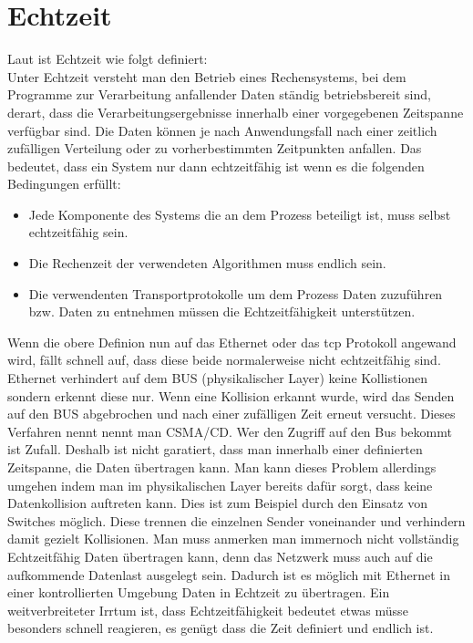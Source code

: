 \section{Echtzeit}
Laut \citet{Scholz:2005} ist Echtzeit wie folgt definiert:\\
\glqq Unter Echtzeit versteht man den Betrieb
eines Rechensystems, bei dem Programme zur Verarbeitung
anfallender Daten ständig betriebsbereit sind, derart, dass die
Verarbeitungsergebnisse innerhalb einer vorgegebenen Zeitspanne
verfügbar sind. Die Daten können je nach Anwendungsfall nach
einer zeitlich zufälligen Verteilung oder zu vorherbestimmten
Zeitpunkten anfallen.\grqq
Das bedeutet, dass ein System nur dann echtzeitfähig ist wenn es die folgenden Bedingungen erfüllt:
\begin{itemize}
  \item Jede Komponente des Systems die an dem Prozess beteiligt ist, muss selbst echtzeitfähig sein.
  \item Die Rechenzeit der verwendeten Algorithmen muss endlich sein.
  \item Die verwendenten Transportprotokolle um dem Prozess Daten zuzuführen bzw. Daten zu entnehmen müssen die Echtzeitfähigkeit unterstützen.
\end{itemize}
Wenn die obere Definion nun auf das Ethernet oder das \ac{tcp} Protokoll angewand wird, fällt schnell auf, 
dass diese beide normalerweise nicht echtzeitfähig sind.
Ethernet verhindert auf dem BUS (physikalischer Layer) keine Kollistionen sondern erkennt diese nur. 
Wenn eine Kollision erkannt wurde, 
wird das Senden auf den BUS abgebrochen und nach einer zufälligen Zeit erneut versucht.
Dieses Verfahren nennt nennt man \ac{CSMA/CD}. 
Wer den Zugriff auf den Bus bekommt ist Zufall.
Deshalb ist nicht garatiert, dass man innerhalb einer definierten Zeitspanne, die Daten übertragen kann.
Man kann dieses Problem allerdings umgehen indem man im physikalischen Layer bereits dafür sorgt, 
dass keine Datenkollision auftreten kann. Dies ist zum Beispiel durch den Einsatz von Switches möglich.
Diese trennen die einzelnen Sender voneinander und verhindern damit gezielt Kollisionen.
Man muss anmerken man immernoch nicht vollständig Echtzeitfähig Daten übertragen kann, 
denn das Netzwerk muss auch auf die aufkommende Datenlast ausgelegt sein.
Dadurch ist es möglich mit Ethernet in einer kontrollierten Umgebung Daten in Echtzeit zu übertragen.
Ein weitverbreiteter Irrtum ist, dass Echtzeitfähigkeit bedeutet etwas müsse besonders schnell reagieren, 
es genügt dass die Zeit definiert und endlich ist.
